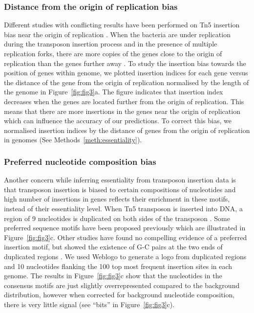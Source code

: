 \documentclass[12pt,letterpaper]{article}
\begin{document}
\subsubsection{Distance from the origin of replication bias}
Different studies with conflicting results have been performed on Tn5 insertion bias near the origin of replication \cite{jacobs_comprehensive_2003, gallagher_genome-scale_2011, zomer_essentials:_2012, barquist_comparison_2013, rubin_essential_2015}. When the bacteria are under replication during the transposon insertion process and in the presence of multiple replication forks, there are more copies of the genes close to the origin of replication than the genes further away \cite{barquist_comparison_2013}. To study the insertion bias towards the position of genes within genome, we plotted insertion indices for each gene versus the distance of the gene from the origin of replication normalised by the length of the genome in Figure~\ref{fig:fig3}a. The figure indicates that insertion index decreases when the genes are located further from the origin of replication. This means that there are more insertions in the genes near the origin of replication which can influence the accuracy of our predictions. To correct this bias, we normalised insertion indices by the distance of genes from the origin of replication in genomes (See Methods~\ref{meth:essentiality}).

\subsubsection{Preferred nucleotide composition bias}
Another concern while inferring essentiality from transposon insertion data is that transposon insertion is biased to certain compositions of nucleotides and high number of insertions in genes reflects their enrichment in these motifs, instead of their essentiality level. When Tn5 transposon is inserted into DNA, a region of 9 nucleotides is duplicated on both sides of the transposon \cite{goryshin_tn5/is50_1998}. Some preferred sequence motifs have been proposed previously \cite{goryshin_tn5/is50_1998, canals_high-throughput_2012} which are illustrated in Figure~\ref{fig:fig3}c. Other studies have found no compelling evidence of a preferred insertion motif, but showed the existence of G-C pairs at the two ends of duplicated regions \cite{green_insertion_2012, rubin_essential_2015}. We used Weblogo \cite{crooks_weblogo:_2004} to generate a logo from duplicated regions and 10 nucleotides flanking the 100 top most frequent insertion sites in each genome. The results in Figure~\ref{fig:fig3}c show that the nucleotides in the consensus motifs are just slightly overrepresented compared to the background distribution, however when corrected for background nucleotide composition, there is very little signal (see ``bits'' in Figure~\ref{fig:fig3}c).
\end{document}
